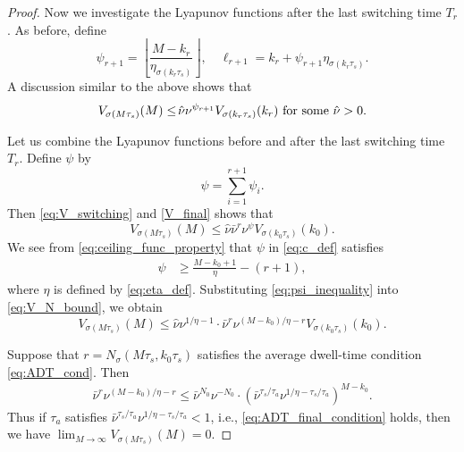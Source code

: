 \documentclass[letterpaper, 11pt, onecolumn]{ieeeconf}  \IEEEoverridecommandlockouts
\begin{document}
\begin{proof}
Now we investigate the Lyapunov functions after the last switching time $T_r$.
As before, define
\begin{equation*}
\psi_{r+1}= \left\lfloor \frac{M- k_{r} }{\eta_{\sigma(k_{r}\tau_s)}} \right\rfloor, \quad
\ell_{r+1} = k_{r} + \psi_{r+1} \eta_{\sigma(k_{r}\tau_s)}.
\end{equation*}
A discussion similar to the above shows that
\begin{align}
\label{V_final}
V_{\sigma (M\tau_s)}(M) 
\leq \hspace{-1.5pt} 
\hat{\nu} \nu^{\psi_{r+1}}V_{\sigma (k_r \tau_s)}(k_r)
~\text{for some $\hat{\nu}>0$.}
\end{align}









Let us combine
the Lyapunov functions before and after the
last switching time $T_r$.
Define $\psi$ by
\begin{equation}
\label{eq:c_def}
\psi = \sum_{i=1}^{r+1} \psi_i.
\end{equation}
Then \eqref{eq:V_switching} and \eqref{V_final} shows that
\begin{equation}
\label{eq:V_N_bound}
V_{\sigma(M\tau_s)}(M) \leq \hat \nu \bar \nu^{r} \nu^{\psi}V_{\sigma(k_0\tau_s)}(k_0).
\end{equation}
We see from \eqref{eq:ceiling_func_property} that
$\psi$ in \eqref{eq:c_def} satisfies
\begin{align}
\psi
&\geq 
\frac{M - k_0 + 1}{\eta} - (r+1), \label{eq:psi_inequality}
\end{align}
where $\eta$ is defined by \eqref{eq:eta_def}.
Substituting \eqref{eq:psi_inequality} into \eqref{eq:V_N_bound},
we obtain
\begin{equation}
V_{\sigma(M\tau_s)}(M) \leq 
\hat \nu \nu^{1/\eta - 1}  \cdot
\bar \nu^r \nu^{(M-k_0)/\eta - r}
V_{\sigma(k_0\tau_s)}(k_0).
\end{equation}

Suppose that $r = N_{\sigma}(M\tau_s, k_0\tau_s)$ satisfies 
the average dwell-time condition \eqref{eq:ADT_cond}.
Then
\begin{align*}
\bar \nu^r \nu^{(M-k_0)/\eta - r}
\leq
\bar \nu^{N_0}\nu^{-N_0}
\cdot
\left(
\bar \nu^{\tau_s / \tau_a}
\nu^{1/\eta - \tau_s/ \tau_a}
\right)^{M- k_0}.
\end{align*}
Thus if $\tau_a$ satisfies
$\bar \nu^{\tau_s / \tau_a}
\nu^{1/\eta - \tau_s/ \tau_a} < 1$, i.e., \eqref{eq:ADT_final_condition} 
holds,
then we have
$
\lim_{M \to \infty} V_{\sigma(M\tau_s)}(M) = 0.
$



\end{proof}
\end{document}
